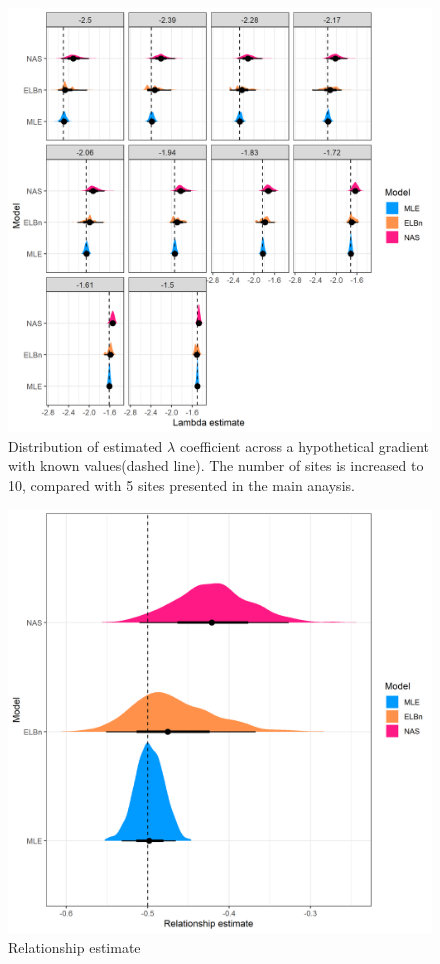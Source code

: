 \documentclass[
]{article}
\begin{document}
\begin{figure}
\centering
\includegraphics{figures/PLB_10_sites_est_b_density.png}
\caption{Distribution of estimated \(\lambda\) coefficient across a
hypothetical gradient with known values(dashed line). The number of
sites is increased to 10, compared with 5 sites presented in the main
anaysis.}
\end{figure}

\newpage

\begin{figure}
\centering
\includegraphics{figures/PLB_10_sites_relationship_density.png}
\caption{Relationship estimate}
\end{figure}
\end{document}
